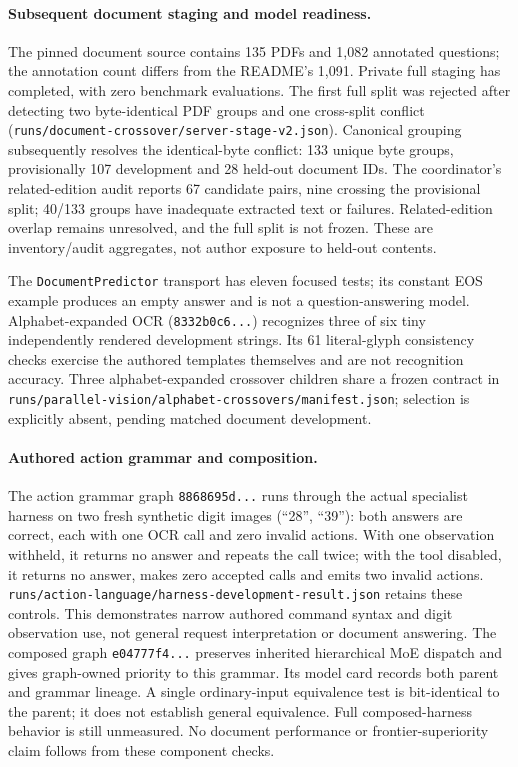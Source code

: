 \documentclass[11pt]{article}
\begin{document}
\paragraph{Subsequent document staging and model readiness.}
The pinned document source contains 135 PDFs and 1{,}082 annotated questions;
the annotation count differs from the README's 1{,}091. Private full staging
has completed, with zero benchmark evaluations. The first full split was
rejected after detecting two byte-identical PDF groups and one cross-split
conflict (\texttt{runs/document-crossover/server-stage-v2.json}). Canonical
grouping subsequently resolves the identical-byte conflict: 133 unique byte
groups, provisionally 107 development and 28 held-out document IDs. The
coordinator's related-edition audit reports 67 candidate pairs, nine crossing
the provisional split; 40/133 groups have inadequate extracted text or failures.
Related-edition overlap remains unresolved, and the full split is not frozen.
These are inventory/audit aggregates, not author exposure to held-out contents.

The \texttt{DocumentPredictor} transport has eleven focused tests; its constant
EOS example produces an empty answer and is not a question-answering model.
Alphabet-expanded OCR (\texttt{8332b0c6...}) recognizes three of six tiny
independently rendered development strings. Its 61 literal-glyph consistency
checks exercise the authored templates themselves and are not recognition
accuracy. Three alphabet-expanded crossover children share a frozen contract
in \texttt{runs/parallel-vision/alphabet-crossovers/manifest.json}; selection is
explicitly absent, pending matched document development.

\paragraph{Authored action grammar and composition.}
The action grammar graph \texttt{8868695d...} runs through the actual specialist
harness on two fresh synthetic digit images (``28'', ``39''): both answers are
correct, each with one OCR call and zero invalid actions. With one observation
withheld, it returns no answer and repeats the call twice; with the tool
disabled, it returns no answer, makes zero accepted calls and emits two invalid
actions. \texttt{runs/action-language/harness-development-result.json} retains
these controls. This demonstrates narrow authored command syntax and digit
observation use, not general request interpretation or document answering.
The composed graph \texttt{e04777f4...} preserves inherited hierarchical MoE
dispatch and gives graph-owned priority to this grammar. Its model card records
both parent and grammar lineage. A single ordinary-input equivalence test is
bit-identical to the parent; it does not establish general equivalence. Full
composed-harness behavior is still unmeasured. No document performance or
frontier-superiority claim follows from these component checks.
\end{document}
